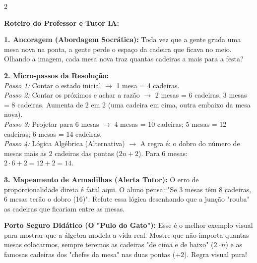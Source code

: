 \begin{multicols*}{2}
\ifgabarito
    \begin{tcolorbox}[colback=CorTitUm!5, colframe=CorTitUm, boxrule=1pt, arc=4pt, left=6pt, right=6pt, top=6pt, bottom=6pt]
    \small\textbf{\textcolor{CorTitUm}{Roteiro do Professor e Tutor IA:}}\par\vspace{0.1cm}
    \color{CinzaEscuro}
    \textbf{1. Ancoragem (Abordagem Socrática):} Toda vez que a gente gruda uma mesa nova na ponta, a gente perde o espaço da cadeira que ficava no meio. Olhando a imagem, cada mesa nova traz quantas cadeiras a mais para a festa?\par\vspace{0.1cm}
    
    \textbf{2. Micro-passos da Resolução:}\\
    \textit{Passo 1:} Contar o estado inicial $\rightarrow$ 1 mesa = 4 cadeiras.\\
    \textit{Passo 2:} Contar os próximos e achar a razão $\rightarrow$ 2 mesas = 6 cadeiras. 3 mesas = 8 cadeiras. Aumenta de 2 em 2 (uma cadeira em cima, outra embaixo da mesa nova).\\
    \textit{Passo 3:} Projetar para 6 mesas $\rightarrow$ 4 mesas = 10 cadeiras; 5 mesas = 12 cadeiras; 6 mesas = 14 cadeiras.\\
    \textit{Passo 4:} Lógica Algébrica (Alternativa) $\rightarrow$ A regra é: o dobro do número de mesas mais as 2 cadeiras das pontas ($2n + 2$). Para 6 mesas: $2 \cdot 6 + 2 = 12 + 2 = 14$.\par\vspace{0.1cm}
    
    \textbf{3. Mapeamento de Armadilhas (Alerta Tutor):} O erro de proporcionalidade direta é fatal aqui. O aluno pensa: "Se 3 mesas têm 8 cadeiras, 6 mesas terão o dobro (16)". Refute essa lógica desenhando que a junção "rouba" as cadeiras que ficariam entre as mesas.
    \end{tcolorbox}
    \vspace{0.15cm}
    
    \begin{boxexplicacao}
    \textbf{Porto Seguro Didático (O "Pulo do Gato"):} Esse é o melhor exemplo visual para mostrar que a álgebra modela a vida real. Mostre que não importa quantas mesas colocarmos, sempre teremos as cadeiras "de cima e de baixo" ($2 \cdot n$) e as famosas cadeiras dos "chefes da mesa" nas duas pontas ($+2$). Regra visual pura!
    \end{boxexplicacao}
\fi


\end{multicols*}

